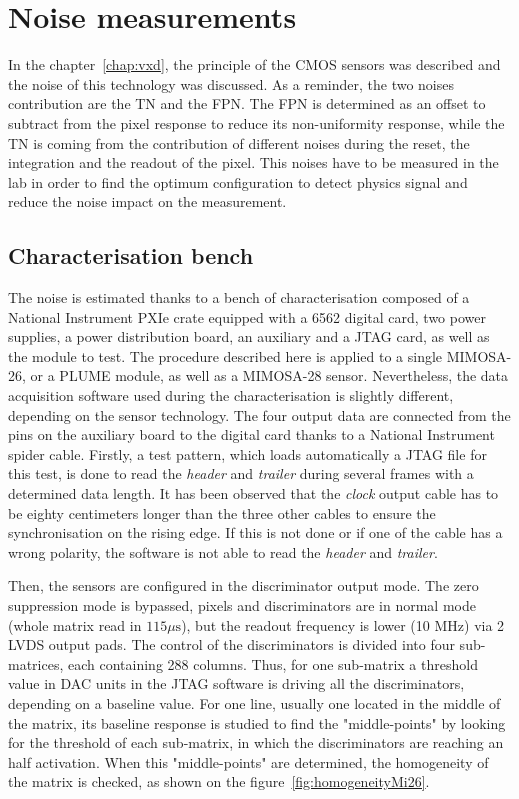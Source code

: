 \section{Noise measurements}

  In the chapter~\ref{chap:vxd}, the principle of the \gls{CMOS} sensors was described and the noise of this technology was discussed.
  As a reminder, the two noises contribution are the \acrfull{TN} and the \acrfull{FPN}.
  The \gls{FPN} is determined as an offset to subtract from the pixel response to reduce its non-uniformity response, while the \gls{TN} is coming from the contribution of different noises during the reset, the integration and the readout of the pixel.
  This noises have to be measured in the lab in order to find the optimum configuration to detect physics signal and reduce the noise impact on the measurement.

  \subsection{Characterisation bench}

  The noise is estimated thanks to a bench of characterisation composed of a National Instrument PXIe crate equipped with a 6562 digital card, two power supplies, a power distribution board, an auxiliary and a JTAG card, as well as the module to test.
  The procedure described here is applied to a single MIMOSA-26, or a PLUME module, as well as a MIMOSA-28 sensor.
  Nevertheless, the data acquisition software used during the characterisation is slightly different, depending on the sensor technology.
  The four output data are connected from the pins on the auxiliary board to the digital card thanks to a National Instrument spider cable.
  Firstly, a test pattern, which loads automatically a JTAG file for this test, is done to read the \textit{header} and \textit{trailer} during several frames with a determined data length.
  It has been observed that the \textit{clock} output cable has to be eighty centimeters longer than the three other cables to ensure the synchronisation on the rising edge.
  If this is not done or if one of the cable has a wrong polarity, the software is not able to read the \textit{header} and \textit{trailer}.

  Then, the sensors are configured in the discriminator output mode.
  The zero suppression mode is bypassed, pixels and discriminators are in normal mode (whole matrix read in $115\mu\text{s}$), but the readout frequency is lower (10 MHz) via 2 LVDS output pads.
  The control of the discriminators is divided into four sub-matrices, each containing 288 columns.
  Thus, for one sub-matrix a threshold value in DAC units in the JTAG software is driving all the discriminators, depending on a baseline value.
  For one line, usually one located in the middle of the matrix, its baseline response is studied to find the "middle-points" by looking for the threshold of each sub-matrix, in which the discriminators are reaching an half activation.
  When this "middle-points" are determined, the homogeneity of the matrix is checked, as shown on the figure~\ref{fig:homogeneityMi26}.
  
